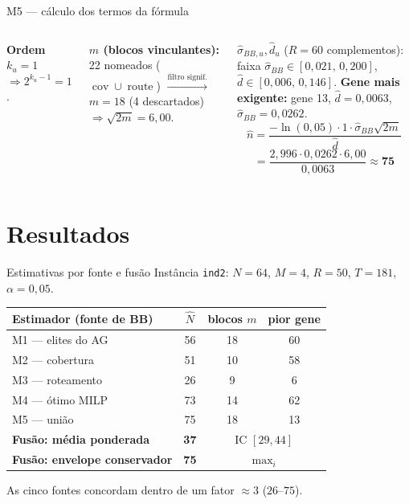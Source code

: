 \documentclass[aspectratio=169]{beamer}
\newcommand{\Nhat}{\hat{N}}
\newcommand{\cov}{\operatorname{cov}}
\newcommand{\route}{\operatorname{route}}
\begin{document}
\begin{frame}{M5 --- cálculo dos termos da fórmula}
\small
\begin{columns}[T]
\textbf{Ordem $k_u=1$} $\Rightarrow 2^{k_u-1}=1$.
\medskip

\textbf{$m$ (blocos vinculantes):} 22 nomeados ($\cov\cup\route$)
$\xrightarrow{\text{filtro signif.}}$ $m=18$ (4 descartados)
$\Rightarrow \sqrt{2m}=6{,}00$.
\medskip

\textbf{$\widehat\sigma_{BB,u},\widehat d_u$} ($R=60$ complementos):
faixa $\widehat\sigma_{BB}\in[0{,}021,\,0{,}200]$,
$\widehat d\in[0{,}006,\,0{,}146]$.
\textbf{Gene mais exigente:} gene 13,
$\widehat d=0{,}0063$, $\widehat\sigma_{BB}=0{,}0262$.
\[
\widehat n=\frac{-\ln(0{,}05)\cdot 1\cdot \widehat\sigma_{BB}\sqrt{2m}}{\widehat d}
\]
\[
=\frac{2{,}996\cdot 0{,}0262\cdot 6{,}00}{0{,}0063}\approx \mathbf{75}
\]
\end{columns}
\end{frame}

\section{Resultados}
\begin{frame}{Estimativas por fonte e fusão}
\centering
Instância \texttt{ind2}: $N=64$, $M=4$, $R=50$, $T=181$, $\alpha=0{,}05$.
\vfill
\small
\begin{tabular}{lccc}
\toprule
Estimador (fonte de BB) & $\Nhat$ & blocos $m$ & pior gene\\
\midrule
M1 --- elites do AG        & 56 & 18 & 60\\
M2 --- cobertura           & 51 & 10 & 58\\
M3 --- roteamento          & 26 &  9 &  6\\
M4 --- ótimo MILP          & 73 & 14 & 62\\
M5 --- união               & 75 & 18 & 13\\
\midrule
\textbf{Fusão: média ponderada} & \textbf{37} & \multicolumn{2}{c}{IC $[29,44]$}\\
\textbf{Fusão: envelope conservador} & \textbf{75} & \multicolumn{2}{c}{$\max_i$}\\
\bottomrule
\end{tabular}
\vfill
\normalsize
As cinco fontes concordam dentro de um fator $\approx 3$ ($26$--$75$).
\end{frame}
\end{document}
